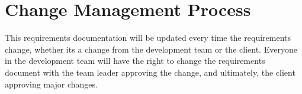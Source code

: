\documentclass[12pt, a4paper]{article}
\begin{document}

	\section{Change Management Process}
	This requirements documentation will be updated every time the requirements change, whether its a change from the development team or the client. Everyone in the development team will have the right to change the requirements document with the team leader approving the change, and ultimately, the client approving major changes.

	\pagebreak

	
	\newpage
	\nocite{*}
	
	

	
\end{document}
